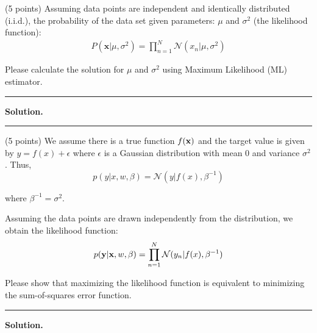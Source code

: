 \documentclass{exam}
\newcommand{\xx}{{\bf{x}}}
\begin{document}
\begin{questions}

 (5 points) Assuming data points are independent and identically distributed (i.i.d.), the probability of the data set given parameters: $\mu$ and $\sigma^2$ (the likelihood function):
\begin{align}
\nonumber P(\mathbf{x}|\mu,\sigma^2) = \prod_{n=1}^N\mathcal{N}(x_n|\mu,\sigma^2)
\end{align}

Please calculate the solution for $\mu$ and $\sigma^2$ using Maximum Likelihood (ML) estimator.


\vspace{2mm}\hrule\vspace{2mm} 

\textbf{Solution.} \\[0.5mm]  






\vspace{2mm}\hrule\vspace{2mm}


\newpage
{} (5 points) We assume there is a true function $f(\xx)$ and the target value is given by $y=f(x)+\epsilon$ where $\epsilon$ is a Gaussian distribution with mean $0$ and variance $\sigma^2$.
Thus,
$$p(y|x,w,\beta) =\mathcal{N}(y| f(x), \beta^{-1})$$

where $\beta^{-1} = \sigma^2$.

Assuming the data points are drawn independently from the distribution, we obtain the likelihood function:
$$p(\mathbf{y}|\xx,w,\beta) = \prod_{n=1}^N \mathcal{N}(y_n|f(x),\beta^{-1})$$

Please show that maximizing the likelihood function is equivalent to minimizing the sum-of-squares error function.

\vspace{2mm}\hrule\vspace{2mm} 

\textbf{Solution.} \\[0.5mm]  






\end{questions}
\end{document}
